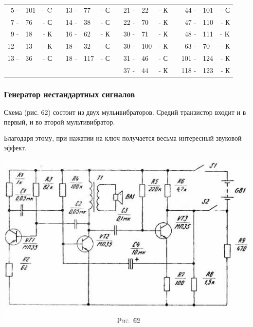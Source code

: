 \documentclass[12pt]{article}
\begin{document}
\vspace*{5.5cm}

\hrulefill

\begin{tabular}{r l r p{0.5cm} r l r p{0.5cm} r l r p{0.5cm} r l r}
 5 - & 101 & - C &   & 13 - &  77 & - С &   &  21 - &  22 & - К &   &  44 - & 101  & - С\\
 7 - &  76 & - С &   & 14 - &  38 & - С &   &  22 - &  70 & - К &   &  47 - & 110  & - К\\
 9 - &  18 & - К &   & 16 - &  62 & - К &   &  30 - &  71 & - К &   &  48 - & 111  & - K\\
12 - &  13 & - К &   & 18 - &  32 & - С &   &  30 - & 100 & - К &   &  63 - &  70  & - К\\
13 - &  36 & - С &   & 18 - & 117 & - С &   &  31 - &  46 & - С &   & 101 - & 124  & - К\\
     &     &     &   &      &     &     &   &  37 - &  44 & - К &   & 118 - & 123  & - К\\
\end{tabular}

\hrulefill

\subsubsection{Генератор нестандартных сигналов}
Схема (рис. 62) состоит из двух мульивибраторов. Средий транзистор входит и в первый, и во второй мультивибратор. 

\newpage

Благодаря этому, при нажатии на ключ получается весьма интересный звуковой эффект.

\includegraphics[scale=1, angle=0]{ekon3_062_1}
\end{document}
